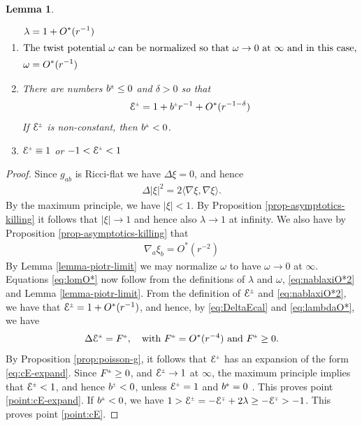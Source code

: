 \documentclass[a4paper,11pt,reqno]{amsart}
\newcommand{\la}{\langle}
\newcommand{\ra}{\rangle}
\newcommand{\cE}{\mathcal{E}}
\theoremstyle{plain}
\newtheorem{lemma}[thm]{Lemma}
\newcommand{\PM}[1]{{{#1}^{\hspace{-.5pt}\scaleto{\pm}{3.5pt}}}}
\newcommand{\MP}[1]{{{#1}^{\hspace{-.5pt}\scaleto{\mp}{3.5pt}}}}
\numberwithin{equation}{section}
\begin{document}
\begin{lemma}
\label{lem:Eprop}  
\begin{enumerate} 
\item \label{point:lmnO*} 
\begin{subequations}\label{eq:lomO*}
\begin{align} 
\lambda ={}& 1 + O^*(r^{-1}) \label{eq:lambdaO*}  \\
\intertext{The twist potential $\omega$ can be normalized so that $\omega \rightarrow 0$ at $\infty$ and in this case,} 
\omega ={}& O^*(r^{-1}) \label{eq:omegaO*} 
\end{align} 
\end{subequations} 
\item \label{point:cE-expand}
There are numbers $\PM{b} \leq 0$ and  $\delta > 0$ so that
\begin{align} \label{eq:cE-expand} 
\PM{\cE} = 1 + \PM{b} r^{-1} + O^*(r^{-1- \delta})
\end{align} 
If $\PM{\cE}$ is non-constant, then $\PM{b} < 0$. 
\item \label{point:cE} 
$\PM{\cE} \equiv 1$ or $-1 < \PM{\cE} < 1$ 
\end{enumerate} 
\end{lemma} 
\begin{proof} 

Since  $g_{ab}$ is Ricci-flat we have $\Delta \xi = 0$, and hence
\begin{align} 
\Delta |\xi|^2 = 2 \la \nabla\xi, \nabla\xi\ra . 
\end{align} 
By the maximum principle, we have $|\xi| < 1$. By Proposition \ref{prop-asymptotics-killing} it follows that $|\xi| \to 1$ and hence also $\lambda \to 1$ at infinity. 
We also have by Proposition \ref{prop-asymptotics-killing} that \begin{align} \label{eq:nablaxiO*2}
\nabla_a \xi_b = O^*(r^{-2})
\end{align} 
By Lemma \ref{lemma-piotr-limit} we may normalize $\omega$ to have $\omega \rightarrow 0$ at $\infty$. 
Equations \eqref{eq:lomO*} now follow from the definitions of $\lambda$ and $\omega$, \eqref{eq:nablaxiO*2} and Lemma \ref{lemma-piotr-limit}. 
From the definition of $\PM{\cE}$ and \eqref{eq:nablaxiO*2}, we have that $\PM{\cE} = 1 + O^*(r^{-1})$, and hence, by \eqref{eq:DeltaEcal} and \eqref{eq:lambdaO*}, we have 
\begin{align} \label{eq:Duf}
\Delta \PM{\cE} = \PM{F}, \quad \text{with $\PM{F} = O^*(r^{-4})$ and $\PM{F} \geq 0$.}
\end{align}
By Proposition \ref{prop:poisson-g}, it follows that 
$\PM{\cE}$ has an expansion of the form \eqref{eq:cE-expand}. Since $\PM{F} \geq 0$, and $\PM{\cE} \to 1$ at $\infty$, the maximum principle implies that $\PM{\cE} < 1$, and hence $\PM{b} < 0$, unless $\PM{\cE} = 1$ and $\PM{b} = 0$ . This proves point \eqref{point:cE-expand}. 
If $\PM{b} < 0$, we have $1 > \PM{\cE} = - \MP{\cE} + 2\lambda \geq - \MP{\cE} > -1$. This proves point \eqref{point:cE}.
\end{proof} 
\end{document}
